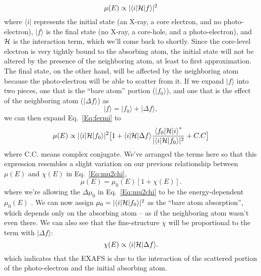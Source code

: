 \begin{equation}
 \mu(E) \propto   { | \langle i | {\cal{H}} | f \rangle |^2   }
 \label{Eq:fermi}
\end{equation}
\noindent
where $ \langle i | $ represents the initial state (an X-ray, a core
electron, and no photo-electron), $|f\rangle$ is the final state (no X-ray,
a core-hole, and a photo-electron), and $\cal{H}$ is the interaction term,
which we'll come back to shortly.  Since the core-level electron is very
tightly bound to the absorbing atom, the initial state will not be altered
by the presence of the neighboring atom, at least to first approximation.
The final state, on the other hand, will be affected by the neighboring
atom because the photo-electron will be able to scatter from it.  If we
expand $|f\rangle$ into two pieces, one that is the ``bare atom'' portion
($|f_0\rangle$), and one that is the effect of the neighboring atom
($|\Delta f\rangle$) as
\begin{equation}
  |f\rangle = |f_0\rangle + |\Delta f\rangle,
\end{equation}
\noindent
we can then expand Eq.~\ref{Eq:fermi} to
\begin{equation}
  \mu(E) \propto {{| \langle i | {\cal{H}} | f_0 \rangle |^2}}
  \bigl[ 1 + {{\langle i | {\cal{H}}| \Delta f \rangle }}
    { \frac{   {\langle f_0 | {\cal{H}} | i \rangle }^{*}
      }{ | \langle i | {\cal{H}} | f_0 \rangle |^2 } }  + C.C \bigr]
\end{equation}
\noindent
where C.C. means complex conjugate. We've arranged the terms here so that
this expression resembles a slight variation on our previous relationship
between $\mu(E)$ and
$\chi(E)$   in Eq.~\ref{Eq:mu2chi},
\begin{equation}
  \mu(E)  = \mu_0(E) [ 1 + \chi(E)].
\end{equation}
\noindent
where we're allowing the $\Delta\mu_0$ in Eq.~\ref{Eq:mu2chi} to be the
energy-dependent $\mu_0(E)$ .  We can now assign $\mu_0 = | \langle i |
{\cal{H}} | f_0 \rangle |^2 $ as the ``bare atom absorption'', which
depends only on the absorbing atom -- as if the neighboring atom wasn't
even there.  We can also see that the fine-structure $\chi$ will be
proportional to the term with $|\Delta f\rangle$:
\begin{equation}
  \chi(E)  \propto \langle i | {\cal{H}}| \Delta f \rangle.
\end{equation}
\noindent
which indicates that the EXAFS is due to the interaction of the scattered
portion of the photo-electron and the initial absorbing atom.

